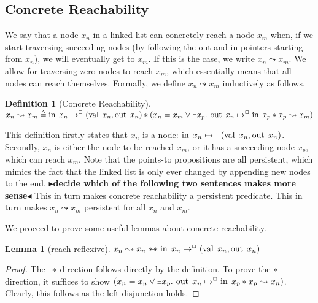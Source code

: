 \documentclass[twoside,11pt,openright]{report}
\newtheorem{lemma}[theorem]{Lemma}
\newtheorem{definition}{Definition}[section]
\newcommand{\nIn}[1]{\operatorname{in} \; #1}
\newcommand{\nVal}[1]{\operatorname{val} \; #1}
\newcommand{\nOut}[1]{\operatorname{out} \; #1}
\newcommand{\isNode}[1]{\nIn{#1} \mapsto^{\persistently} (\nVal{#1}, \nOut{#1})}
\newcommand{\reach}[2]{#1 \leadsto #2}
\newcommand{\todo}[1]{{\color[rgb]{.5,0,0}\textbf{$\blacktriangleright$#1$\blacktriangleleft$}}}
\begin{document}
\subsection{Concrete Reachability}
We say that a node $x_n$ in a linked list can concretely reach a node $x_m$ when, if we start traversing succeeding nodes (by following the out and in pointers starting from $x_n$), we will eventually get to $x_m$. If this is the case, we write $\reach{x_n}{x_m}$. We allow for traversing zero nodes to reach $x_m$, which essentially means that all nodes can reach themselves. Formally, we define $\reach{x_n}{x_m}$ inductively as follows.
\begin{definition}[Concrete Reachability]
  $\reach{x_n}{x_m} \eqdef \nIn{x_n} \mapsto^{\persistently} (\nVal{x_n}, \nOut{x_n}) \star (x_n = x_m \lor \Exists x_p . \nOut{x_n} \mapsto^{\persistently} \nIn{x_p} \star \reach{x_p}{x_m})$
\end{definition}
This definition firstly states that $x_n$ is a node: $\nIn{x_n} \mapsto^{\persistently} (\nVal{x_n}, \nOut{x_n})$. Secondly, $x_n$ is either the node 
to be reached $x_m$, or it has a succeeding node $x_p$, which can reach $x_m$.
Note that the points-to propositions are all persistent, which mimics the fact that the linked list is only ever changed by appending new nodes to the end.
\todo{decide which of the following two sentences makes more sense}
This in turn makes concrete reachability a persistent predicate.
This in turn makes $\reach{x_n}{x_m}$ persistent for all $x_n$ and $x_m$.

We proceed to prove some useful lemmas about concrete reachability.
\begin{lemma}[reach-reflexive]\label{lemma:reach-reflexive}
  $\reach{x_n}{x_n} \wandIff \isNode{x_n}$
\end{lemma}
\begin{proof}
  The $\mathrel{-\!\!*}$ direction follows directly by the definition. To prove the $\mathrel{*\!\!-}$ direction, it suffices to show $(x_n = x_n \lor \Exists x_p . \nOut{x_n} \mapsto^{\persistently} \nIn{x_p} \star \reach{x_p}{x_n})$. Clearly, this follows as the left disjunction holds.
\end{proof}
\end{document}
